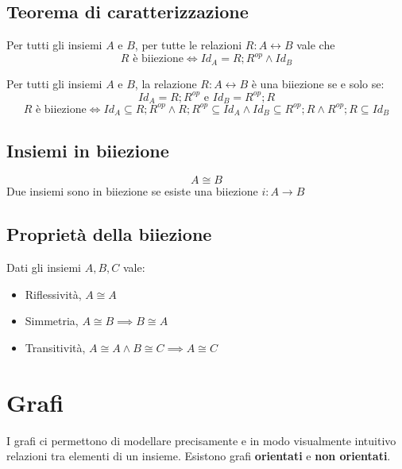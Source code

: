 \documentclass{article}
\begin{document}
\subsection*{Teorema di caratterizzazione}
Per tutti gli insiemi \(A\) e \(B\), per tutte le relazioni \(R: A \leftrightarrow B\) vale che
\[R \text{ è biiezione} \iff Id_A = R;R^{op} \land Id_B\]

Per tutti gli insiemi \(A\) e \(B\), la relazione \(R: A \leftrightarrow B\) è una biiezione se e solo se:
\[Id_A = R;R^{op} \text{ e } Id_B = R^{op};R\]
\[R \text{ è biiezione} \iff Id_A \subseteq R;R^{op} \land R;R^{op} \subseteq Id_A \land Id_B \subseteq R^{op};R \land R^{op};R \subseteq Id_B \]
\subsection*{Insiemi in biiezione}
\[A \cong B\]
Due insiemi sono in biiezione se esiste una biiezione \(i: A \rightarrow B\)
\subsection*{Proprietà della biiezione}
Dati gli insiemi \(A,B,C\) vale:
\begin{itemize}
    \item Riflessività, \(A \cong A\)
    \item Simmetria, \(A \cong B \implies B \cong A\)
    \item Transitività, \(A \cong A \land B \cong C \implies A \cong C\)
\end{itemize}
\pagebreak

\section{Grafi}
I grafi ci permettono di modellare precisamente e in modo visualmente intuitivo relazioni tra elementi di un insieme. Esistono grafi \textbf{orientati} e \textbf{non orientati}.
\end{document}
